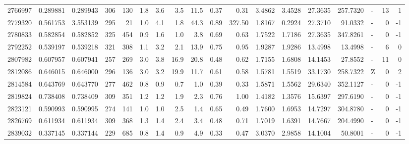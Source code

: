 \begin{tabular}{rrrrrrrrrrrrrrrlrr}
   2766997 & 0.289881 &   0.289943 &  306 &  130 &      1.8 &      3.6 &     3.5 &     11.5 &       0.37 &        0.31 &  3.4862 &  3.4528 &   27.3635 &  257.7320 &             - &       13 &          1 \\
   2779320 & 0.561753 &   3.553139 &  295 &   21 &      1.0 &      4.1 &     1.8 &     44.3 &       0.89 &      327.50 &  1.8167 &  0.2924 &   27.3710 &   91.0332 &             - &        0 &         -1 \\
   2780833 & 0.582854 &   0.582852 &  325 &  454 &      0.9 &      1.6 &     1.0 &      3.8 &       0.69 &        0.63 &  1.7522 &  1.7186 &   27.3635 &  347.8261 &             - &        0 &         -1 \\
   2792252 & 0.539197 &   0.539218 &  321 &  308 &      1.1 &      3.2 &     2.1 &     13.9 &       0.75 &        0.95 &  1.9287 &  1.9286 &   13.4998 &   13.4998 &             - &        6 &          0 \\
   2807982 & 0.607957 &   0.607941 &  257 &  269 &      3.0 &      3.8 &    16.9 &     20.8 &       0.48 &        0.62 &  1.7155 &  1.6808 &   14.1453 &   27.8552 &             - &       11 &          0 \\
   2812086 & 0.646015 &   0.646000 &  296 &  136 &      3.0 &      3.2 &    19.9 &     11.7 &       0.61 &        0.58 &  1.5781 &  1.5519 &   33.1730 &  258.7322 &             Z &        0 &          2 \\
   2814584 & 0.643769 &   0.643770 &  277 &  462 &      0.8 &      0.9 &     0.7 &      1.0 &       0.39 &        0.33 &  1.5871 &  1.5562 &   29.6340 &  352.1127 &             - &        0 &         -1 \\
   2819824 & 0.738408 &   0.738409 &  309 &  351 &      1.2 &      1.2 &     1.9 &      2.3 &       0.76 &        1.00 &  1.4182 &  1.3576 &   15.6397 &  297.6190 &             - &        0 &         -1 \\
   2823121 & 0.590993 &   0.590995 &  274 &  141 &      1.0 &      1.0 &     2.5 &      1.4 &       0.65 &        0.49 &  1.7600 &  1.6953 &   14.7297 &  304.8780 &             - &        0 &         -1 \\
   2826769 & 0.611934 &   0.611934 &  309 &  368 &      1.3 &      1.4 &     2.4 &      3.4 &       0.48 &        0.71 &  1.7019 &  1.6391 &   14.7667 &  204.4990 &             - &        0 &         -1 \\
   2839032 & 0.337145 &   0.337144 &  229 &  685 &      0.8 &      1.4 &     0.9 &      4.9 &       0.33 &        0.47 &  3.0370 &  2.9858 &   14.1004 &   50.8001 &             - &        0 &         -1 \\

\end{tabular}
